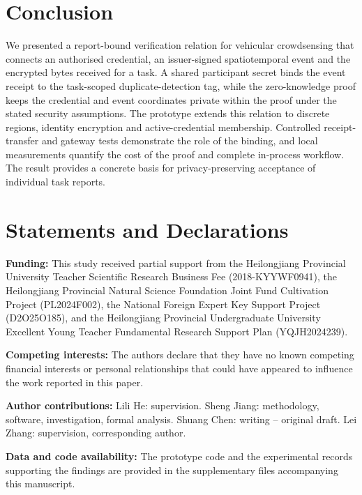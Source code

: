 \documentclass[pdflatex,iicol,sn-mathphys-num]{sn-jnl}
\begin{document}
\section{Conclusion}
We presented a report-bound verification relation for vehicular crowdsensing that connects an authorised credential, an issuer-signed spatiotemporal event and the encrypted bytes received for a task. A shared participant secret binds the event receipt to the task-scoped duplicate-detection tag, while the zero-knowledge proof keeps the credential and event coordinates private within the proof under the stated security assumptions. The prototype extends this relation to discrete regions, identity encryption and active-credential membership. Controlled receipt-transfer and gateway tests demonstrate the role of the binding, and local measurements quantify the cost of the proof and complete in-process workflow. The result provides a concrete basis for privacy-preserving acceptance of individual task reports.



\section*{Statements and Declarations}
\noindent\textbf{Funding:} This study received partial support from the Heilongjiang Provincial University Teacher Scientific Research Business Fee (2018-KYYWF0941), the Heilongjiang Provincial Natural Science Foundation Joint Fund Cultivation Project (PL2024F002), the National Foreign Expert Key Support Project (D2O25O185), and the Heilongjiang Provincial Undergraduate University Excellent Young Teacher Fundamental Research Support Plan (YQJH2024239).

\noindent\textbf{Competing interests:} The authors declare that they have no known competing financial interests or personal relationships that could have appeared to influence the work reported in this paper.

\noindent\textbf{Author contributions:} Lili He: supervision. Sheng Jiang: methodology, software, investigation, formal analysis. Shuang Chen: writing -- original draft. Lei Zhang: supervision, corresponding author.

\noindent\textbf{Data and code availability:} The prototype code and the experimental records supporting the findings are provided in the supplementary files accompanying this manuscript.
\end{document}
